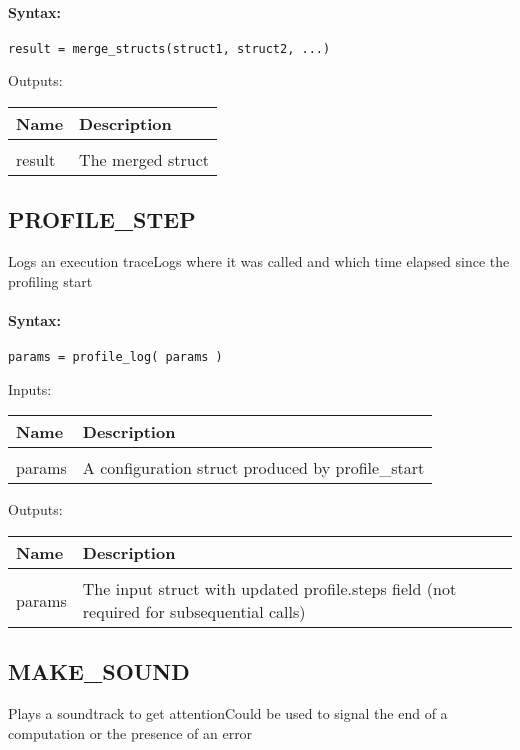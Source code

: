 \paragraph{Syntax:} \verb|result = merge_structs(struct1, struct2, ...)|

Outputs:

\begin{tabular}{|l|p{5cm}|}
\hline
\textbf{Name} & \textbf{Description} \\
\hline \hline \\
result & The merged struct  \\ \hline
\end{tabular}

\subsection{PROFILE\_STEP}

Logs an execution traceLogs where it was called and which time elapsed since the profiling start

\paragraph{Syntax:} \verb|params = profile_log( params )|

Inputs:

\begin{tabular}{|l|p{5cm}|}
\hline
\textbf{Name} & \textbf{Description} \\
\hline \hline \\
params & A configuration struct produced by profile\_start  \\ \hline
\end{tabular}
Outputs:

\begin{tabular}{|l|p{5cm}|}
\hline
\textbf{Name} & \textbf{Description} \\
\hline \hline \\
params & The input struct with updated profile.steps field (not required for subsequential calls)  \\ \hline
\end{tabular}

\subsection{MAKE\_SOUND}

Plays a soundtrack to get attentionCould be used to signal the end of a computation or the presence of an error

